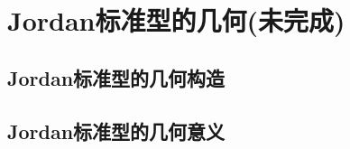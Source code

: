 \documentclass[../../main.tex]{subfiles}%
\begin{document}
\section{Jordan标准型的几何(未完成)}

\subsection{Jordan标准型的几何构造}



\subsection{Jordan标准型的几何意义}
\end{document}

